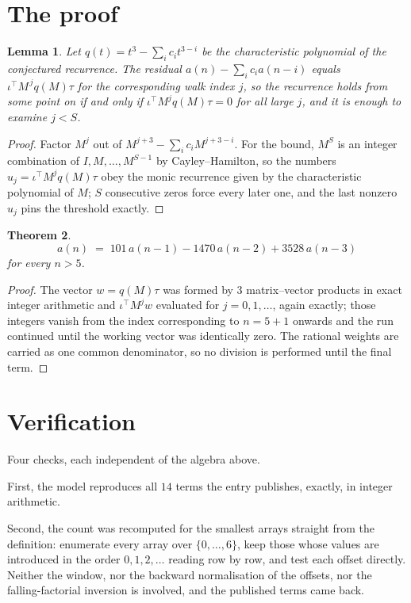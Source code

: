 \documentclass[11pt,a4paper]{article}
\theoremstyle{plain}
\newtheorem{theorem}{Theorem}
\newtheorem{lemma}[theorem]{Lemma}
\theoremstyle{definition}
\begin{document}
\section{The proof}

\begin{lemma}\label{lem:crit}
Let $q(t)=t^{3}-\sum_i c_it^{3-i}$ be the characteristic polynomial of the
conjectured recurrence. The residual $a(n)-\sum_ic_ia(n-i)$ equals
$\iota^{\!\top}M^{\,j}q(M)\tau$ for the corresponding walk index $j$, so the recurrence
holds from some point on if and only if $\iota^{\!\top}M^{j}q(M)\tau=0$ for all large $j$,
and it is enough to examine $j<S$.
\end{lemma}

\begin{proof}
Factor $M^{j}$ out of $M^{j+3}-\sum_ic_iM^{j+3-i}$. For the bound, $M^{S}$
is an integer combination of $I,M,\dots,M^{S-1}$ by Cayley--Hamilton, so the numbers
$u_j=\iota^{\!\top}M^{j}q(M)\tau$ obey the monic recurrence given by the characteristic
polynomial of $M$; $S$ consecutive zeros force every later one, and the last nonzero $u_j$
pins the threshold exactly.
\end{proof}

\begin{theorem}
\[
a(n)\;=\;101\,a(n-1) - 1470\,a(n-2) + 3528\,a(n-3)
\]
for every $n>5$.
\end{theorem}

\begin{proof}
The vector $w=q(M)\tau$ was formed by $3$ matrix--vector products in exact integer
arithmetic and $\iota^{\!\top}M^{j}w$ evaluated for $j=0,1,\dots$, again exactly; those
integers vanish from the index corresponding to $n=5+1$ onwards and the run continued
until the working vector was identically zero. The rational weights are carried as one common
denominator, so no division is performed until the final term.
\end{proof}

\section{Verification}

Four checks, each independent of the algebra above.

First, the model reproduces all $14$ terms the entry publishes, exactly, in integer
arithmetic.

Second, the count was recomputed for the smallest arrays straight from the definition:
enumerate every array over $\{0,\dots,6\}$, keep those whose values are introduced in the
order $0,1,2,\dots$ reading row by row, and test each offset directly. Neither the window, nor
the backward normalisation of the offsets, nor the falling-factorial inversion is involved, and
the published terms came back.
\end{document}
